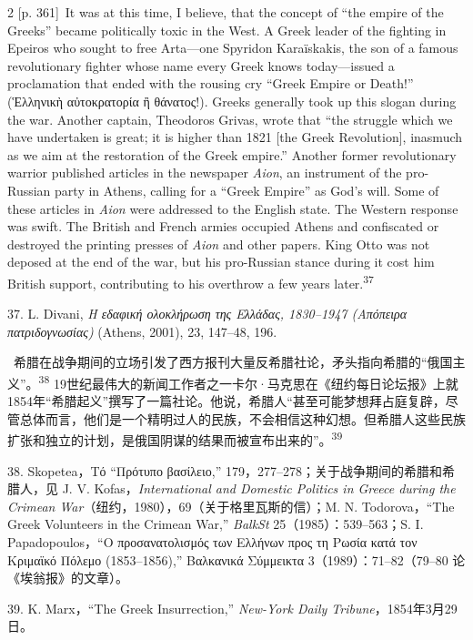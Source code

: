\documentclass[10pt,a4paper]{article}
\begin{document}
\begin{paracol}{2}
\switchcolumn
{\scriptsize\color{gray}[p. 361]}\ It was at this time, I believe, that the concept of “the empire of the Greeks” became politically toxic in the West. A Greek leader of the fighting in Epeiros who sought to free Arta—one Spyridon Karaïskakis, the son of a famous revolutionary fighter whose name every Greek knows today—issued a proclamation that ended with the rousing cry “Greek Empire or Death!” (Ἑλληνικὴ αὐτοκρατορία ἢ θάνατος!). Greeks generally took up this slogan during the war. Another captain, Theodoros Grivas, wrote that “the struggle which we have undertaken is great; it is higher than 1821 [the Greek Revolution], inasmuch as we aim at the restoration of the Greek empire.” Another former revolutionary warrior published articles in the newspaper \textit{Aion}, an instrument of the pro-Russian party in Athens, calling for a “Greek Empire” as God’s will. Some of these articles in \textit{Aion} were addressed to the English state. The Western response was swift. The British and French armies occupied Athens and confiscated or destroyed the printing presses of \textit{Aion} and other papers. King Otto was not deposed at the end of the war, but his pro-Russian stance during it cost him British support, contributing to his overthrow a few years later.\nobreak\textsuperscript{37}\par{\small 37. L. Divani, \textit{Η εδαφική ολοκλήρωση της Ελλάδας, 1830–1947 (Απόπειρα πατριδογνωσίας)} (Athens, 2001), 23, 147–48, 196.\par}
\switchcolumn*
{\scriptsize\color{gray}[p. 361]}\ 希腊在战争期间的立场引发了西方报刊大量反希腊社论，矛头指向希腊的“俄国主义”。\nobreak\textsuperscript{38} 19世纪最伟大的新闻工作者之一卡尔·马克思在《纽约每日论坛报》上就1854年“希腊起义”撰写了一篇社论。他说，希腊人“甚至可能梦想拜占庭复辟，尽管总体而言，他们是一个精明过人的民族，不会相信这种幻想。但希腊人这些民族扩张和独立的计划，是俄国阴谋的结果而被宣布出来的”。\nobreak\textsuperscript{39}\par{\small 38. Skopetea，Τό “Πρότυπο βασίλειο,” 179，277–278；关于战争期间的希腊和希腊人，见 J. V. Kofas，\textit{International and Domestic Politics in Greece during the Crimean War}（纽约，1980），69（关于格里瓦斯的信）；M. N. Todorova，“The Greek Volunteers in the Crimean War,” \textit{BalkSt} 25（1985）：539–563；S. I. Papadopoulos，“Ο προσανατολισμός των Ελλήνων προς τη Ρωσία κατά τον Κριμαϊκό Πόλεμο (1853–1856),” Βαλκανικά Σύμμεικτα 3（1989）：71–82（79–80 论《埃翁报》的文章）。\par}{\small 39. K. Marx，“The Greek Insurrection,” \textit{New-York Daily Tribune}，1854年3月29日。\par}

\end{paracol}
\end{document}
